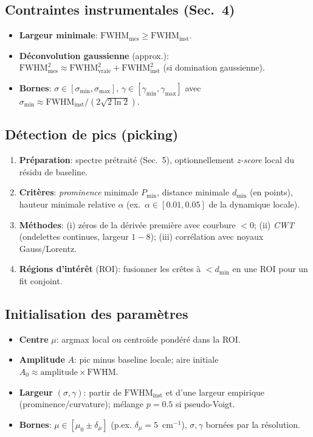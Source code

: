 \subsection{Contraintes instrumentales (Sec.~4)}
\begin{itemize}[nosep]
\item \textbf{Largeur minimale}: $\mathrm{FWHM}_{\text{mes}} \ge \mathrm{FWHM}_{\text{inst}}$.
\item \textbf{Déconvolution gaussienne} (approx.): $\mathrm{FWHM}_{\text{mes}}^2 \approx \mathrm{FWHM}_{\text{vraie}}^2 + \mathrm{FWHM}_{\text{inst}}^2$ (si domination gaussienne).
\item \textbf{Bornes}: $\sigma \in [\sigma_{\min}, \sigma_{\max}]$, $\gamma \in [\gamma_{\min}, \gamma_{\max}]$ avec $\sigma_{\min}\approx \mathrm{FWHM}_{\text{inst}}/(2\sqrt{2\ln2})$.
\end{itemize}

\subsection{Détection de pics (picking)}
\begin{enumerate}[nosep]
\item \textbf{Préparation}: spectre prétraité (Sec.~5), optionnellement \emph{z-score} local du résidu de baseline.
\item \textbf{Critères}: \emph{prominence} minimale $P_{\min}$, distance minimale $d_{\min}$ (en points), hauteur minimale relative $\alpha$ (ex.~$\alpha\in[0.01,0.05]$ de la dynamique locale).
\item \textbf{Méthodes}: (i) zéros de la dérivée première avec courbure $<0$; (ii) \emph{CWT} (ondelettes continues, largeur $1\!-\!8$); (iii) corrélation avec noyaux Gauss/Lorentz.
\item \textbf{Régions d'intérêt} (ROI): fusionner les crêtes à $<d_{\min}$ en une ROI pour un fit conjoint.
\end{enumerate}

\subsection{Initialisation des paramètres}
\begin{itemize}[nosep]
\item \textbf{Centre} $\mu$: argmax local ou centroïde pondéré dans la ROI.
\item \textbf{Amplitude} $A$: pic minus baseline locale; aire initiale $A_0 \approx \text{amplitude}\times\mathrm{FWHM}$.
\item \textbf{Largeur} $(\sigma,\gamma)$: partir de $\mathrm{FWHM}_{\text{inst}}$ et d'une largeur empirique (prominence/curvature); mélange $p=0.5$ si pseudo-Voigt.
\item \textbf{Bornes}: $\mu \in [\mu_0\pm \delta_\mu]$ (p.ex. $\delta_\mu=5$~cm$^{-1}$), $\sigma,\gamma$ bornées par la résolution.
\end{itemize}

